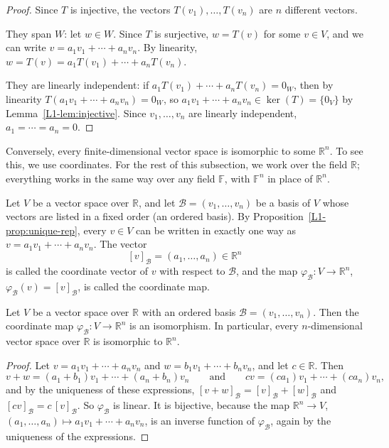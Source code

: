 \begin{proof}
    Since $T$ is injective, the vectors $T(v_1), \ldots, T(v_n)$ are $n$ different vectors.

    They span $W$: let $w \in W$. Since $T$ is surjective, $w = T(v)$ for some $v \in V$, and we can write $v = a_1 v_1 + \cdots + a_n v_n$. By linearity, $w = T(v) = a_1 T(v_1) + \cdots + a_n T(v_n)$.

    They are linearly independent: if $a_1 T(v_1) + \cdots + a_n T(v_n) = 0_W$, then by linearity $T(a_1 v_1 + \cdots + a_n v_n) = 0_W$, so $a_1 v_1 + \cdots + a_n v_n \in \ker(T) = \{0_V\}$ by Lemma~\ref{L1-lem:injective}. Since $v_1, \ldots, v_n$ are linearly independent, $a_1 = \cdots = a_n = 0$.
\end{proof}

Conversely, every finite-dimensional vector space is isomorphic to some $\mathbb{R}^n$. To see this, we use coordinates. For the rest of this subsection, we work over the field $\mathbb{R}$; everything works in the same way over any field $\mathbb{F}$, with $\mathbb{F}^n$ in place of $\mathbb{R}^n$.

\begin{definition}[Coordinates]\label{L1-def:coordinates}
    Let $V$ be a vector space over $\mathbb{R}$, and let $\mathcal{B} = (v_1, \ldots, v_n)$ be a basis of $V$ whose vectors are listed in a fixed order (an ordered basis). By Proposition~\ref{L1-prop:unique-rep}, every $v \in V$ can be written in exactly one way as $v = a_1 v_1 + \cdots + a_n v_n$. The vector
    \[[v]_{\mathcal{B}} = (a_1, \ldots, a_n) \in \mathbb{R}^n\]
    is called the coordinate vector of $v$ with respect to $\mathcal{B}$, and the map $\varphi_{\mathcal{B}}: V \to \mathbb{R}^n$, $\varphi_{\mathcal{B}}(v) = [v]_{\mathcal{B}}$, is called the coordinate map.
\end{definition}

\begin{theorem}\label{L1-thm:coordinates}
    Let $V$ be a vector space over $\mathbb{R}$ with an ordered basis $\mathcal{B} = (v_1, \ldots, v_n)$. Then the coordinate map $\varphi_{\mathcal{B}}: V \to \mathbb{R}^n$ is an isomorphism. In particular, every $n$-dimensional vector space over $\mathbb{R}$ is isomorphic to $\mathbb{R}^n$.
\end{theorem}

\begin{proof}
    Let $v = a_1 v_1 + \cdots + a_n v_n$ and $w = b_1 v_1 + \cdots + b_n v_n$, and let $c \in \mathbb{R}$. Then
    \[v + w = (a_1 + b_1) v_1 + \cdots + (a_n + b_n) v_n \qquad \text{and} \qquad cv = (c a_1) v_1 + \cdots + (c a_n) v_n,\]
    and by the uniqueness of these expressions, $[v + w]_{\mathcal{B}} = [v]_{\mathcal{B}} + [w]_{\mathcal{B}}$ and $[cv]_{\mathcal{B}} = c\,[v]_{\mathcal{B}}$. So $\varphi_{\mathcal{B}}$ is linear. It is bijective, because the map $\mathbb{R}^n \to V$, $(a_1, \ldots, a_n) \mapsto a_1 v_1 + \cdots + a_n v_n$, is an inverse function of $\varphi_{\mathcal{B}}$, again by the uniqueness of the expressions.
\end{proof}

